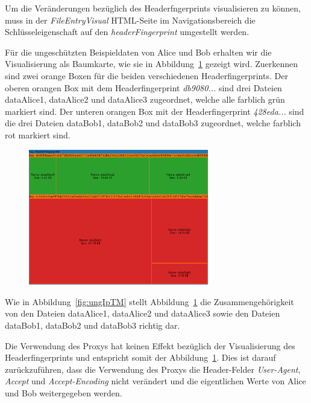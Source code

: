 \documentclass[
    fontsize=12pt,
    headings=small,
    parskip=half,           %
    bibliography=totoc,
    numbers=noenddot,       %
    open=any,               %
    ]{scrreprt}
\begin{document}
Um die Veränderungen bezüglich des Headerfngerprints visualisieren zu können, muss in der \textit{FileEntryVisual} \ac{HTML}-Seite im Navigationsbereich die Schlüsseleigenschaft auf den \textit{headerFingerprint} umgestellt werden.

Für die ungeschützten Beispieldaten von Alice und Bob erhalten wir die Visualisierung als Baumkarte, wie sie in  Abbildung~\ref{fig:ungHTM} gezeigt wird.
Zuerkennen sind zwei orange Boxen für die beiden verschiedenen Headerfingerprints.
Der oberen orangen Box mit dem Headerfingerprint \textit{db9080...} sind drei Dateien dataAlice1, dataAlice2 und dataAlice3 zugeordnet, welche alle farblich grün markiert sind.
Der unteren orangen Box mit der Headerfingerprint \textit{428eda...} sind die drei Dateien dataBob1, dataBob2 und dataBob3 zugeordnet, welche farblich rot markiert sind.

\begin{figure}[H]
\includegraphics[width=0.7\textwidth]{../pic/Header-Proxy-SetA.png}
\label{fig:ungHTM}
\end{figure}

Wie in Abbildung~\ref{fig:ungIpTM} stellt Abbildung~\ref{fig:ungHTM} die Zusammengehörigkeit von den Dateien dataAlice1, dataAlice2 und dataAlice3 sowie den Dateien dataBob1, dataBob2 und dataBob3 richtig dar.

Die Verwendung des Proxys hat keinen Effekt bezüglich der Visualisierung des Headerfingerprints und entspricht somit der Abbildung~\ref{fig:ungHTM}.
Dies ist darauf zurückzuführen, dass die Verwendung des Proxys die Header-Felder \textit{User-Agent}, \textit{Accept} und \textit{Accept-Encoding} nicht verändert und die eigentlichen Werte von Alice und Bob weitergegeben werden.
\end{document}
